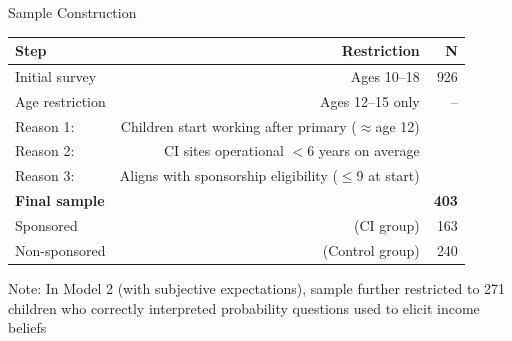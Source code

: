 \documentclass[aspectratio=169, 10pt]{beamer}
\begin{document}
\begin{frame}{Sample Construction}
  \begin{center}
    \begin{tabular}{lrr}
      \toprule
      \textbf{Step} & \textbf{Restriction} & \textbf{N} \\
      \midrule
      Initial survey & Ages 10--18 & 926 \\
      Age restriction & Ages 12--15 only & -- \\
      \quad Reason 1: & Children start working after primary ($\approx$age 12) & \\
      \quad Reason 2: & CI sites operational $<$6 years on average & \\
      \quad Reason 3: & Aligns with sponsorship eligibility ($\leq$9 at start) & \\
      \midrule
      \textbf{Final sample} & & \textbf{403} \\
      \quad Sponsored & (CI group) & 163 \\
      \quad Non-sponsored & (Control group) & 240 \\
      \bottomrule
    \end{tabular}
  \end{center}
  \vspace{0.5em}
  \begin{small}
    Note: In Model 2 (with subjective expectations), sample further restricted to 271 children who correctly interpreted probability questions used to elicit income beliefs
  \end{small}
\end{frame}
\end{document}
